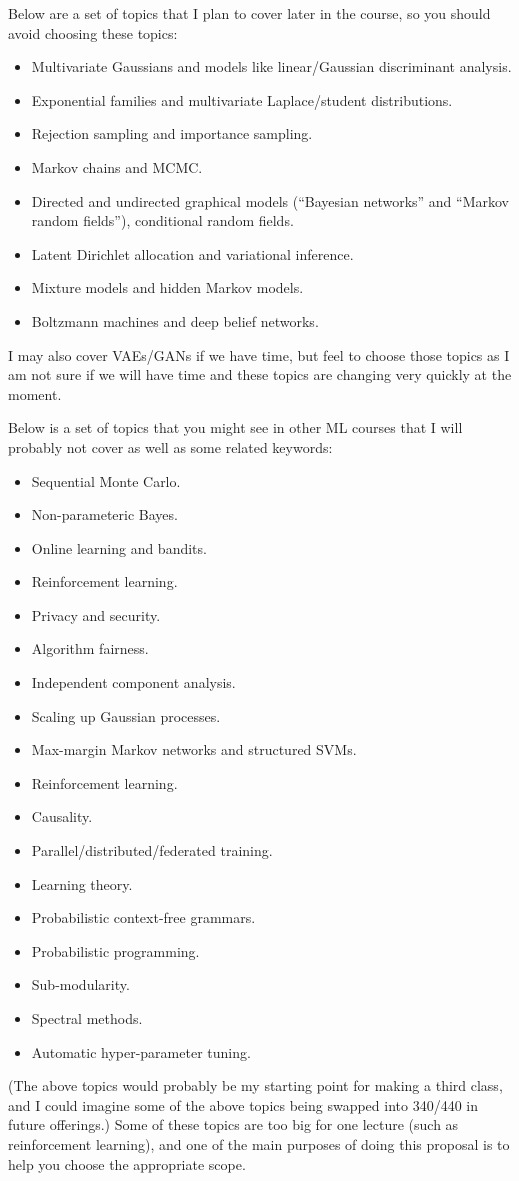 \documentclass{article}
\def\items#1{\begin{itemize}#1\end{itemize}}
\begin{document}
Below are a set of topics that I plan to cover later in the course, so you should avoid choosing these topics:
\items{
\item Multivariate Gaussians and models like linear/Gaussian discriminant analysis.
\item Exponential families and multivariate Laplace/student distributions.
\item Rejection sampling and importance sampling.
\item Markov chains and MCMC.
\item Directed and undirected graphical models (``Bayesian networks'' and ``Markov random fields''), conditional random fields.
\item Latent Dirichlet allocation and variational inference.
\item Mixture models and hidden Markov models.
\item Boltzmann machines and deep belief networks.
}
I may also cover VAEs/GANs if we have time, but feel to choose those topics as I am not sure if we will have time and these topics are changing very quickly at the moment.

Below is a set of topics that you might see in other ML courses that I will probably not cover as well as some related keywords:
\items{
\item Sequential Monte Carlo.
\item Non-parameteric Bayes.
\item Online learning and bandits.
\item Reinforcement learning.
\item Privacy and security.
\item Algorithm fairness.
\item Independent component analysis.
\item Scaling up Gaussian processes.
\item Max-margin Markov networks and structured SVMs.
\item Reinforcement learning.
\item Causality.
\item Parallel/distributed/federated training.
\item Learning theory.
\item Probabilistic context-free grammars.
\item Probabilistic programming.
\item Sub-modularity.
\item Spectral methods.
\item Automatic hyper-parameter tuning.
 }
 (The above topics would probably be my starting point for making a third class, and I could imagine some of the above topics being swapped into 340/440 in future offerings.) Some of these topics are too big for one lecture (such as reinforcement learning), and one of the main purposes of doing this proposal is to help you choose the appropriate scope.



 
\end{document}
